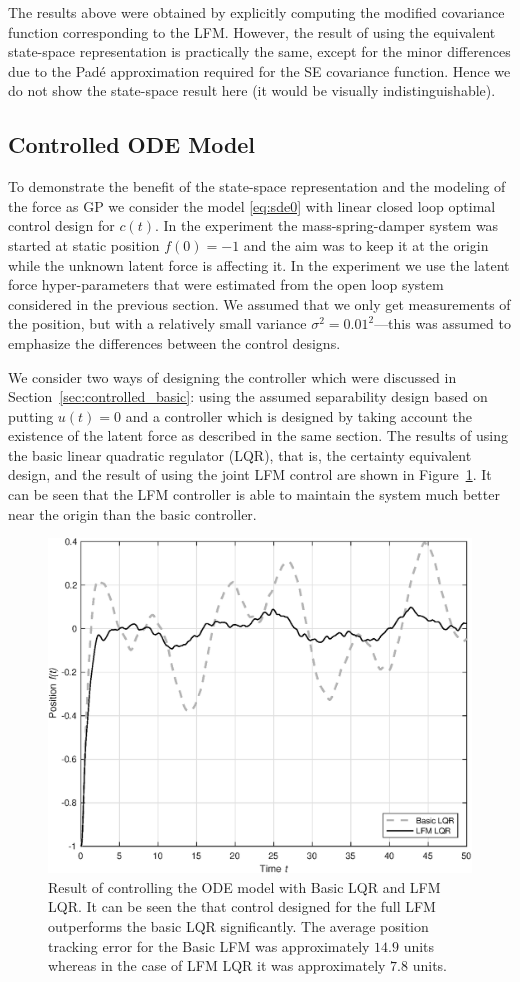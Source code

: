 \documentclass[journal]{IEEEtran}
\begin{document}
The results above were obtained by explicitly computing the modified covariance function corresponding to the LFM. However, the result of using the equivalent state-space representation is practically the same, except for the minor differences due to the Pad\'e approximation required for the SE covariance function. Hence we do not show the state-space result here (it would be visually indistinguishable).

\subsection{Controlled ODE Model}

To demonstrate the benefit of the state-space representation and the modeling of the force as GP we consider the model \eqref{eq:sde0} with linear closed loop optimal control design for $c(t)$. In the experiment the mass-spring-damper system was started at static position $f(0) = -1$ and the aim was to keep it at the origin while the unknown latent force is affecting it. In the experiment we use the latent force hyper-parameters that were estimated from the open loop system considered in the previous section. We assumed that we only get measurements of the position, but with a relatively small variance $\sigma^2 = 0.01^2$---this was assumed to emphasize the differences between the control designs.

We consider two ways of designing the controller which were discussed in Section~\ref{sec:controlled_basic}: using the assumed separability design based on putting $u(t) = 0$ and a controller which is designed by taking account the existence of the latent force as described in the same section. The results of using the basic linear quadratic regulator (LQR), that is, the certainty equivalent design, and the result of using the joint LFM control are shown in Figure~\ref{fig:cntl_spring}. It can be seen that the LFM controller is able to maintain the system much better near the origin than the basic controller.

\begin{figure}[!t]
\centering
\includegraphics[width=0.7\columnwidth]{cntl_spring}
\caption{Result of controlling the ODE model with Basic LQR and LFM LQR. It can be seen the that control designed for the full LFM outperforms the basic LQR significantly. The average position tracking error for the Basic LFM was approximately $14.9$ units whereas in the case of LFM LQR it was approximately $7.8$ units.}
\label{fig:cntl_spring}
\end{figure}
\end{document}
